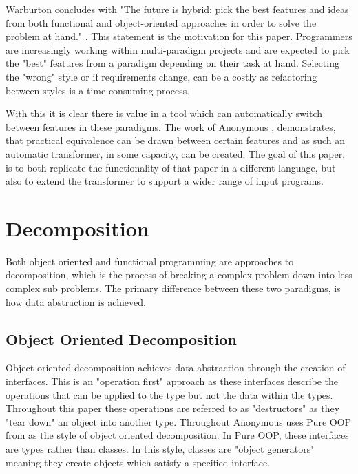 \documentclass[ oneside,%
                    author={James Elgar},
                    degree={MEng},
                     title={Bidirectional transformer between functional and \\ object-oriented programming in Rust},
                  subtitle={}]{dissertation}
\newcommand{\weixin}{Anonymous }
\begin{document}
Warburton concludes with "The future is hybrid: pick the best features and ideas from both
functional and object-oriented approaches in order to solve the
problem at hand." \cite{warburton}. This statement is the motivation for this paper. Programmers are increasingly working within multi-paradigm projects and are expected to pick the "best" features from a paradigm depending on their task at hand. Selecting the "wrong" style or if requirements change, can be a costly as refactoring between styles is a time consuming process.

With this it is clear there is value in a tool which can automatically switch between features in these paradigms. The work of \weixin \cite{food}, demonstrates, that practical equivalence can be drawn between certain features and as such an automatic transformer, in some capacity, can be created. The goal of this paper, is to both replicate the functionality of that paper in a different language, but also to extend the transformer to support a wider range of input programs.

\section{Decomposition}


Both object oriented and functional programming are approaches to decomposition, which is the process of breaking a complex problem down into less complex sub problems. The primary difference between these two paradigms, is how data abstraction is achieved.

\subsection{Object Oriented Decomposition}

Object oriented decomposition achieves data abstraction through the creation of interfaces. This is an "operation first" \cite{food} approach as these interfaces describe the operations that can be applied to the type but not the data within the types.
Throughout this paper these operations are referred to as "destructors" as they "tear down" an object into another type.
Throughout \cite{food} \weixin uses Pure OOP from \cite{cook} as the style of object oriented decomposition. In Pure OOP, these interfaces are types rather than classes.
In this style, classes are "object generators" \cite{food} meaning they create objects which satisfy a specified interface.
\end{document}
